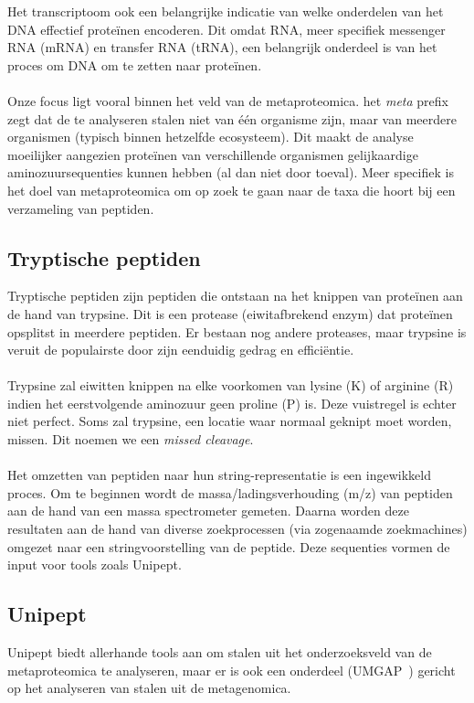 Het transcriptoom ook een belangrijke indicatie van welke onderdelen van het DNA effectief proteïnen encoderen.
Dit omdat RNA, meer specifiek messenger RNA (mRNA) en transfer RNA (tRNA), een belangrijk onderdeel is van het proces om DNA om te zetten naar proteïnen.
\\ \\
Onze focus ligt vooral binnen het veld van de metaproteomica.
het \textit{meta} prefix zegt dat de te analyseren stalen niet van één organisme zijn, maar van meerdere organismen (typisch binnen hetzelfde ecosysteem).
Dit maakt de analyse moeilijker aangezien proteïnen van verschillende organismen gelijkaardige aminozuursequenties kunnen hebben (al dan niet door toeval).
Meer specifiek is het doel van metaproteomica om op zoek te gaan naar de taxa die hoort bij een verzameling van peptiden.

\subsection{Tryptische peptiden}\label{subsec:tryptische-peptiden}
Tryptische peptiden zijn peptiden die ontstaan na het knippen van proteïnen aan de hand van trypsine.
Dit is een protease (eiwitafbrekend enzym) dat proteïnen opsplitst in meerdere peptiden.
Er bestaan nog andere proteases, maar trypsine is veruit de populairste door zijn eenduidig gedrag en efficiëntie.
\\ \\
Trypsine zal eiwitten knippen na elke voorkomen van lysine (K) of arginine (R) indien het eerstvolgende aminozuur geen proline (P) is.
Deze vuistregel is echter niet perfect.
Soms zal trypsine, een locatie waar normaal geknipt moet worden, missen.
Dit noemen we een \textit{missed cleavage}.
\\ \\
Het omzetten van peptiden naar hun string-representatie is een ingewikkeld proces.
Om te beginnen wordt de massa/ladingsverhouding (m/z) van peptiden aan de hand van een massa spectrometer gemeten.
Daarna worden deze resultaten aan de hand van diverse zoekprocessen (via zogenaamde zoekmachines) omgezet naar een stringvoorstelling van de peptide.
Deze sequenties vormen de input voor tools zoals Unipept.

\subsection{Unipept}\label{subsec:unipept-introductie}
Unipept biedt allerhande tools aan om stalen uit het onderzoeksveld van de metaproteomica te analyseren, maar er is ook een onderdeel (UMGAP~\cite{UMGAP_paper}) gericht op het analyseren van stalen uit de metagenomica.

